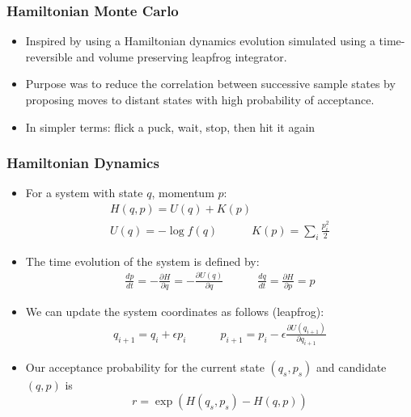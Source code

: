 \documentclass{beamer}
\begin{document}
\begin{frame}
  \frametitle{Hamiltonian Monte Carlo}
  \begin{itemize}
    \item Inspired by using a Hamiltonian dynamics evolution simulated using
    a time-reversible and volume preserving leapfrog integrator.
    \item Purpose was to reduce the correlation between successive sample states by proposing
    moves to distant states with high probability of acceptance.
    \item In simpler terms: flick a puck, wait, stop, then hit it again
  \end{itemize}
\end{frame}

\begin{frame}
  \frametitle{Hamiltonian Dynamics}
  \begin{itemize}
    \item For a system with state $q$, momentum $p$:
  \begin{gather*}
    H(q, p) = U(q) + K(p) \\
    U(q) = - \log f(q) \quad\quad\quad K(p) = \sum_i \frac{p_i^2}{2}
  \end{gather*}
    \item The time evolution of the system is defined by:
  \begin{gather*}
    \frac{d p}{d t} = - \frac{\partial H}{\partial q} = - \frac{\partial U(q)}{\partial q} \quad\quad\quad \frac{d q}{d t} = \frac{\partial H}{\partial p} = p
  \end{gather*}
    \item We can update the system coordinates as follows (leapfrog):
  \begin{gather*}
    q_{i+1} = q_i + \epsilon p_i \quad\quad\quad p_{i+1} = p_i - \epsilon \frac{\partial U(q_{i+1})}{\partial q_{i+1}}
  \end{gather*}
    \item Our acceptance probability for the current state $(q_s, p_s)$ and candidate $(q, p)$ is
  \begin{equation*}
    r = \exp \left( H(q_s, p_s) - H(q, p) \right)
  \end{equation*}
  \end{itemize}
\end{frame}
\end{document}
